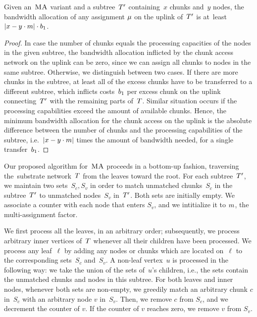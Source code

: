 

\begin{lemma}\label{lem:uplink-alloc}
Given an~$\textsc{MA}$ variant and a subtree~$T'$
containing~$x$
chunks and~$y$ nodes, the bandwidth allocation of any
assignment
$\mu$ on the uplink of~$T'$ is at~least $|x-y\cdot m|\cdot
b_1$.
\label{lemma:uplink}
\end{lemma}
\begin{proof}
In case the number of chunks equals the processing capacities of the
nodes in the given subtree,
the bandwidth allocation inflicted by the chunk access network on the uplink can
be
zero, since we can assign all chunks to nodes in the same subtree.
Otherwise, we distinguish between two cases. If there are more chunks in the subtree, at least all of the excess chunks have to
be transferred to a different subtree, which 
inflicts costs~$b_1$ per excess chunk on the uplink connecting~$T'$
with the
remaining parts of~$T$.
 Similar situation occurs if the processing capabilities exceed the
amount of
available chunks.
Hence, the minimum bandwidth allocation for the chunk access on the uplink
is the absolute difference between the number of chunks and the processing capabilities
of the subtree, i.e.~$|x-y\cdot m|$ times the amount of bandwidth needed,
for a single transfer~$b_1$.
\end{proof}


 Our proposed algorithm for~$\textsc{MA}$
proceeds in a bottom-up fashion, traversing the~substrate network~$T$
from the leaves toward the root.
For each subtree~$T'$, we maintain
two sets~$S_c,S_v$ in order to match unmatched
chunks~$S_c$ in the subtree~$T'$ to unmatched
nodes~$S_v$ in~$T'$. Both sets are initially empty.
We associate a counter with each node that enters $S_v$, and we intitialize it to $m$, the multi-assignment factor.


We first process all the leaves, in an arbitrary order; subsequently, we process arbitrary inner vertices
of~$T$ whenever all their children have been processed.
We process any leaf~$\ell$
by adding any
nodes or chunks which are located on~$\ell$ to the corresponding sets~$S_c$ and~$S_v$.
A non-leaf vertex~$u$ is processed in the following way: we take the union of
the sets of~$u$'s children, i.e., the sets contain the unmatched chunks and nodes
in this subtree.
For both leaves and inner nodes, whenever
both sets are non-empty, we greedily match an arbitrary chunk $c$ in~$S_c$ with an arbitrary node $v$ in~$S_v$.
Then, we remove $c$ from $S_c$, and we decrement the counter of $v$. If the counter of $v$ reaches zero, we remove $v$ from $S_v$.

